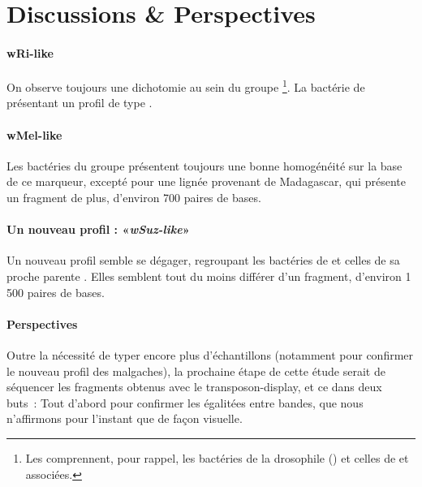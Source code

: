 
\section{Discussions \& Perspectives} %
\label{sec:discussions}

\paragraph{wRi-like} %
\label{par:wri_like}
On observe toujours une dichotomie au sein du groupe \footnote{Les  comprennent, pour rappel, les bactéries de la drosophile  () et celles de  et associées.}. La bactérie de  présentant un profil de type .

\paragraph{wMel-like} %
\label{par:wmel_like}
Les bactéries du groupe  présentent toujours une bonne homogénéité sur la base de ce marqueur, excepté pour une lignée provenant de Madagascar, qui présente un fragment de plus, d'environ 700 paires de bases.

\paragraph{Un nouveau profil : «\textit{wSuz-like}»} %
\label{par:suzukii}
Un nouveau profil semble se dégager, regroupant les bactéries de  et celles de sa proche parente . Elles semblent tout du moins différer d'un fragment, d'environ 1\,500 paires de bases.

\paragraph{Perspectives\\} %
\label{par:perspectives}
Outre la nécessité de typer encore plus d'échantillons (notamment pour confirmer le nouveau profil des  malgaches),
la prochaine étape de cette étude serait de séquencer les fragments obtenus avec le transposon-display, et ce dans deux buts~:
Tout d'abord pour confirmer les égalitées entre bandes, que nous n'affirmons pour l'instant que de façon visuelle.

